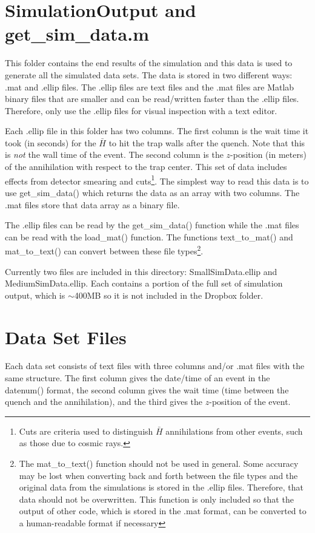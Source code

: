 \documentclass[12pt]{report}
\begin{document}
\section{SimulationOutput and get\_sim\_data.m}
This folder contains the end results of the simulation and this data is used to generate all the simulated data sets.  The data is stored in two different ways: .mat and .ellip files.  The .ellip files are text files and the .mat files are Matlab binary files that are smaller and can be read/written faster than the .ellip files.  Therefore, only use the .ellip files for visual inspection with a text editor.

Each .ellip file in this folder has two columns.  The first  column is the wait time it took (in seconds) for the $\bar{H}$ to hit the trap walls after the quench.  Note that this is \textit{not} the wall time of the event.  The second column is the $z$-position (in meters) of the annihilation with respect to the trap center.  This set of data includes effects from detector smearing and cuts\footnote{Cuts are criteria used to distinguish $\bar{H}$ annihilations from other events, such as those due to cosmic rays.}.  The simplest way to read this data is to use get\_sim\_data() which returns the data as an array with two columns.  The .mat files store that data array as a binary file.

The .ellip files can be read by the get\_sim\_data() function while the .mat files can be read with the load\_mat() function.  The functions text\_to\_mat() and mat\_to\_text() can convert between these file types\footnote{The mat\_to\_text() function should not be used in general.  Some accuracy may be lost when converting back and forth between the file types and the original data from the simulations is stored in the .ellip files.  Therefore, that data should not be overwritten.  This function is only included so that the output of other code, which is stored in the .mat format, can be converted to a human-readable format if necessary}.

Currently two files are included in this directory: SmallSimData.ellip and MediumSimData.ellip.  Each contains a portion of the full set of simulation output, which is ${\sim}$400MB so it is not included in the Dropbox folder.  

\section{Data Set Files}
Each data set consists of text files with three columns and/or .mat files with the same structure.  The first column gives the date/time of an event in the datenum() format, the second column gives the wait time (time between the quench and the annihilation), and the third gives the $z$-position of the event.
\end{document}
